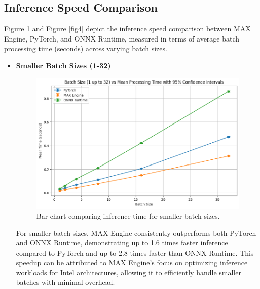 \documentclass[conference]{IEEEtran}
\begin{document}
\subsection{Inference Speed Comparison}
Figure \ref{fig3} and Figure \ref{fig4} depict the inference speed comparison between MAX Engine, PyTorch, and ONNX Runtime, measured in terms of average batch processing time (seconds) across varying batch sizes.

\begin{itemize}
    \item \textbf{Smaller Batch Sizes (1-32)}
    \begin{figure}[H]
        \centerline{\includegraphics[width=\linewidth]{3.png}}
        \caption{Bar chart comparing inference time for smaller batch sizes.}
        \label{fig3}
    \end{figure}
    For smaller batch sizes, MAX Engine consistently outperforms both PyTorch and ONNX Runtime, demonstrating up to 1.6 times faster inference compared to PyTorch and up to 2.8 times faster than ONNX Runtime. This speedup can be attributed to MAX Engine's focus on optimizing inference workloads for Intel architectures, allowing it to efficiently handle smaller batches with minimal overhead.


\end{itemize}
\end{document}
